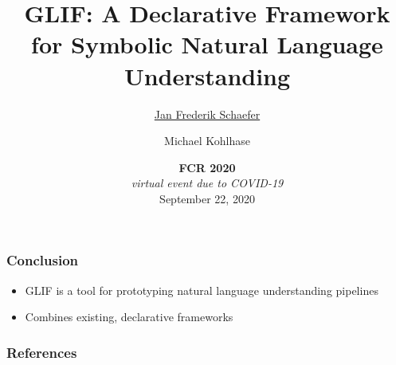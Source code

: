 \documentclass{beamer}
\title{GLIF: A Declarative Framework for Symbolic Natural Language Understanding}
\author{\underline{Jan Frederik Schaefer} \and Michael Kohlhase}
\institute{FAU Erlangen-N\"urnberg}
\date{\textbf{FCR 2020} \\ \textit{virtual event due to COVID-19} \\ September 22, 2020 }
\begin{document}
\frame\titlepage














\begin{frame}
    \frametitle{Conclusion}
    \begin{itemize}
        \item GLIF is a tool for prototyping natural language understanding pipelines
        \item Combines existing, declarative frameworks
    \end{itemize}

    \vspace{2em}
    
\end{frame}

\begin{frame}[allowframebreaks,t]
    \frametitle{References}
    \printbibliography
\end{frame}
\end{document}
